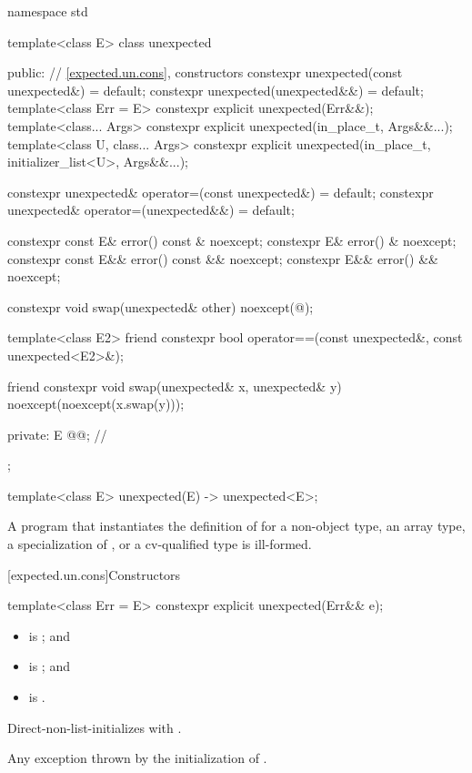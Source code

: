 %
\begin{codeblock}
namespace std {
  template<class E>
  class unexpected {
  public:
    // \ref{expected.un.cons}, constructors
    constexpr unexpected(const unexpected&) = default;
    constexpr unexpected(unexpected&&) = default;
    template<class Err = E>
      constexpr explicit unexpected(Err&&);
    template<class... Args>
      constexpr explicit unexpected(in_place_t, Args&&...);
    template<class U, class... Args>
      constexpr explicit unexpected(in_place_t, initializer_list<U>, Args&&...);

    constexpr unexpected& operator=(const unexpected&) = default;
    constexpr unexpected& operator=(unexpected&&) = default;

    constexpr const E& error() const & noexcept;
    constexpr E& error() & noexcept;
    constexpr const E&& error() const && noexcept;
    constexpr E&& error() && noexcept;

    constexpr void swap(unexpected& other) noexcept(@\seebelow@);

    template<class E2>
      friend constexpr bool operator==(const unexpected&, const unexpected<E2>&);

    friend constexpr void swap(unexpected& x, unexpected& y) noexcept(noexcept(x.swap(y)));

  private:
    E @@;             // \expos
  };

  template<class E> unexpected(E) -> unexpected<E>;
}
\end{codeblock}

\pnum
A program that instantiates the definition of  for
a non-object type,
an array type,
a specialization of , or
a cv-qualified type
is ill-formed.

[expected.un.cons]{Constructors}

%
\begin{itemdecl}
template<class Err = E>
  constexpr explicit unexpected(Err&& e);
\end{itemdecl}

\begin{itemdescr}
\pnum
\constraints
\begin{itemize}
\item
{} is ; and
\item
{} is ; and
\item
{} is .
\end{itemize}

\pnum
\effects
Direct-non-list-initializes  with .

\pnum
\throws
Any exception thrown by the initialization of .
\end{itemdescr}

